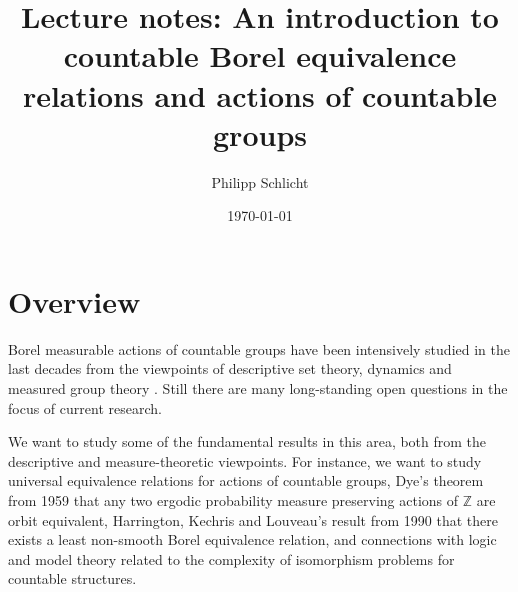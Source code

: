 \documentclass[10pt]{amsart}
\newcommand{\ZZ}{\mathbb{Z}}
\theoremstyle{definition}
\theoremstyle{remark}
\begin{document}




\author{Philipp Schlicht}
\address{Philipp Schlicht, School of Mathematics, University of Bristol, Fry Building, Woodland Road, Bristol, BS8 1UG, UK}
\urladdr{}

\date{\today}


\title[Lecture notes: Countable Borel equivalence relations]{Lecture notes: An introduction to countable Borel equivalence relations and actions of countable groups}


\maketitle


\setcounter{tocdepth}{2}








\section{Overview} 

Borel measurable actions of countable groups have been intensively studied in the last decades from the viewpoints of descriptive set theory, dynamics and measured group theory \cite{MR2827853, MR2711968, MR3612001, MR3359054, MR2583950, KechrisShinko2019, Ioana2019}. 
Still there are many long-standing open questions in the focus of current research. 

We want to study some of the fundamental results in this area, both from the descriptive and measure-theoretic viewpoints. 
For instance, we want to study universal equivalence relations for actions of countable groups, Dye's theorem from 1959 that any two ergodic probability measure preserving actions of $\ZZ$ are orbit equivalent, Harrington, Kechris and Louveau's result from 1990 that there exists a least non-smooth Borel equivalence relation, and connections with logic and model theory related to the complexity of isomorphism problems for countable structures. 
 
\end{document}
